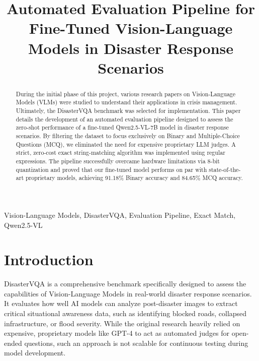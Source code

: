\documentclass[conference]{IEEEtran}
\begin{document}
\title{Automated Evaluation Pipeline for Fine-Tuned Vision-Language Models in Disaster Response Scenarios\\
}

\author{
}

\maketitle

\begin{abstract}
During the initial phase of this project, various research papers on Vision-Language Models (VLMs) were studied to understand their applications in crisis management. Ultimately, the DisasterVQA benchmark was selected for implementation. This paper details the development of an automated evaluation pipeline designed to assess the zero-shot performance of a fine-tuned Qwen2.5-VL-7B model in disaster response scenarios. By filtering the dataset to focus exclusively on Binary and Multiple-Choice Questions (MCQ), we eliminated the need for expensive proprietary LLM judges. A strict, zero-cost exact string-matching algorithm was implemented using regular expressions. The pipeline successfully overcame hardware limitations via 8-bit quantization and proved that our fine-tuned model performs on par with state-of-the-art proprietary models, achieving 91.18\% Binary accuracy and 84.65\% MCQ accuracy.
\end{abstract}

\begin{IEEEkeywords}
Vision-Language Models, DisasterVQA, Evaluation Pipeline, Exact Match, Qwen2.5-VL
\end{IEEEkeywords}

\section{Introduction}
DisasterVQA is a comprehensive benchmark specifically designed to assess the capabilities of Vision-Language Models in real-world disaster response scenarios. It evaluates how well AI models can analyze post-disaster images to extract critical situational awareness data, such as identifying blocked roads, collapsed infrastructure, or flood severity. While the original research heavily relied on expensive, proprietary models like GPT-4 to act as automated judges for open-ended questions, such an approach is not scalable for continuous testing during model development. 
\end{document}
